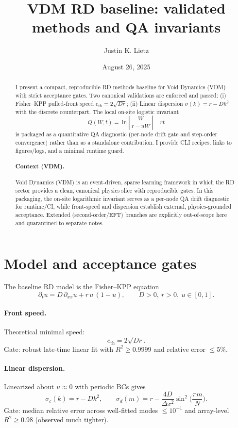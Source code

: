 \documentclass[11pt]{article}
\title{VDM RD baseline: validated methods and QA invariants}
\author{Justin K. Lietz}
\date{August 26, 2025}
\begin{document}
\maketitle

\begin{abstract}
I present a compact, reproducible RD methods baseline for Void Dynamics (VDM) with strict acceptance gates. Two canonical validations are enforced and passed: (i) Fisher--KPP pulled-front speed $c_{\mathrm{th}}=2\sqrt{Dr}$; (ii) Linear dispersion $\sigma(k)=r-Dk^2$ with the discrete counterpart. The local on-site logistic invariant
\[
Q(W,t) = \ln\!\left|\frac{W}{\,r-uW\,}\right| - r t
\]
is packaged as a quantitative QA diagnostic (per-node drift gate and step-order convergence) rather than as a standalone contribution. I provide CLI recipes, links to figures/logs, and a minimal runtime guard.
\paragraph{Context (VDM).} Void Dynamics (VDM) is an event-driven, sparse learning framework in which the RD sector provides a clean, canonical physics slice with reproducible gates. In this packaging, the on-site logarithmic invariant serves as a per-node QA drift diagnostic for runtime/CI, while front-speed and dispersion establish external, physics-grounded acceptance. Extended (second-order/EFT) branches are explicitly out-of-scope here and quarantined to separate notes.
\end{abstract}

\section{Model and acceptance gates}
The baseline RD model is the Fisher--KPP equation
\begin{equation}
\partial_t u = D\,\partial_{xx} u + r\,u\,(1-u),
\qquad D>0,\ r>0,\ u\in[0,1].
\end{equation}

\paragraph{Front speed.} Theoretical minimal speed:
\begin{equation}
c_{\mathrm{th}} = 2\sqrt{D r}.
\end{equation}
Gate: robust late-time linear fit with $R^2 \ge 0.9999$ and relative error $\le 5\%$.

\paragraph{Linear dispersion.} Linearized about $u\approx 0$ with periodic BCs gives
\begin{equation}
\sigma_c(k) = r - D k^2,\qquad
\sigma_d(m) = r - \frac{4D}{\Delta x^2}\sin^2\!\Big(\frac{\pi m}{N}\Big).
\end{equation}
Gate: median relative error across well-fitted modes $\le 10^{-1}$ and array-level $R^2 \ge 0.98$ (observed much tighter).
\end{document}
